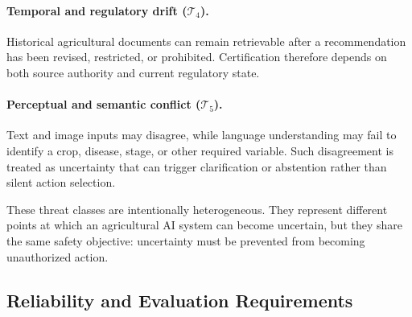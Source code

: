 \documentclass[a4paper,fleqn]{cas-dc}
\begin{document}
\paragraph{Temporal and regulatory drift ($\mathcal{T}_4$).}
Historical agricultural documents can remain retrievable after a recommendation has been revised, restricted, or prohibited. Certification therefore depends on both source authority and current regulatory state.

\paragraph{Perceptual and semantic conflict ($\mathcal{T}_5$).}
Text and image inputs may disagree, while language understanding may fail to identify a crop, disease, stage, or other required variable. Such disagreement is treated as uncertainty that can trigger clarification or abstention rather than silent action selection.

These threat classes are intentionally heterogeneous. They represent different points at which an agricultural AI system can become uncertain, but they share the same safety objective: uncertainty must be prevented from becoming unauthorized action.

\subsection{Reliability and Evaluation Requirements}
\end{document}
